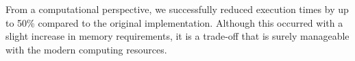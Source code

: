 \documentclass[12pt,	%
	a4paper,		%
	twoside,		%
	openright,		%
	titlepage,%
	]{book}
\theoremstyle{definition}
\let\cite\citep
\newcommand{\mjline}[1]{\texttt{#1}}
\begin{document}

From a computational perspective, we successfully reduced execution times by up to 50\% compared to the original implementation. Although this occurred with a slight increase in memory requirements, it is a trade-off that is surely manageable with the modern computing resources. 


\end{document}
